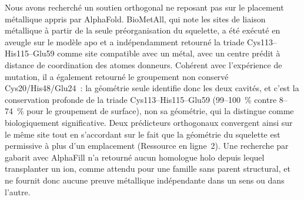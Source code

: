 \documentclass[11pt,a4paper]{article}
\begin{document}
Nous avons recherché un soutien orthogonal ne reposant pas sur le placement métallique appris par AlphaFold. BioMetAll, qui note les sites de liaison métallique à partir de la seule préorganisation du squelette, a été exécuté en aveugle sur le modèle apo et a indépendamment retourné la triade Cys113--His115--Glu59 comme site compatible avec un métal, avec un centre prédit à distance de coordination des atomes donneurs. Cohérent avec l'expérience de mutation, il a également retourné le groupement non conservé Cys20/His48/Glu24~: la géométrie seule identifie donc les deux cavités, et c'est la conservation profonde de la triade Cys113--His115--Glu59 (99--100~\% contre 8--74~\% pour le groupement de surface), non sa géométrie, qui la distingue comme biologiquement significative. Deux prédicteurs orthogonaux convergent ainsi sur le même site tout en s'accordant sur le fait que la géométrie du squelette est permissive à plus d'un emplacement (Ressource en ligne~2). Une recherche par gabarit avec AlphaFill n'a retourné aucun homologue holo depuis lequel transplanter un ion, comme attendu pour une famille sans parent structural, et ne fournit donc aucune preuve métallique indépendante dans un sens ou dans l'autre.
\end{document}
